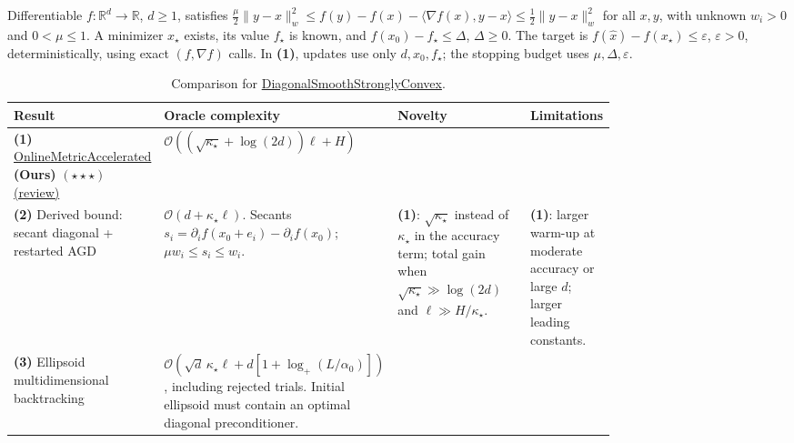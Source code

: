 \begin{table}[tp]
\centering
\caption{Comparison for \href{https://github.com/k3nfalt/longtails/blob/main/LongTails/Setups/DiagonalSmoothStronglyConvex.lean}{DiagonalSmoothStronglyConvex}.}\label{tab:DiagonalSmoothStronglyConvex}
\parbox{\linewidth}{\footnotesize Differentiable $f:\mathbb{R}^d\to\mathbb{R}$, $d\ge1$, satisfies
$\frac{\mu}{2}\|y-x\|_w^2\le f(y)-f(x)-\langle\nabla f(x),y-x\rangle\le\frac12\|y-x\|_w^2$
for all $x,y$, with unknown $w_i>0$ and $0<\mu\le1$. A minimizer $x_\star$ exists, its value $f_\star$ is known, and $f(x_0)-f_\star\le\Delta$, $\Delta\ge0$.
The target is $f(\hat x)-f(x_\star)\le\varepsilon$, $\varepsilon>0$, deterministically, using exact $(f,\nabla f)$ calls. In \textbf{(1)}, updates use only $d,x_0,f_\star$; the stopping budget uses $\mu,\Delta,\varepsilon$.}\par\smallskip
\begin{threeparttable}
\footnotesize
\setlength{\tabcolsep}{4pt}\renewcommand{\arraystretch}{1.25}
\begin{tabularx}{\linewidth}{@{}>{\raggedright\arraybackslash}p{0.20\linewidth}>{\raggedright\arraybackslash}p{0.32\linewidth}>{\raggedright\arraybackslash}p{0.25\linewidth}>{\raggedright\arraybackslash}X@{}}
\toprule
\textbf{Result} & \textbf{Oracle complexity} & \textbf{Novelty} & \textbf{Limitations} \\
\midrule
\textbf{(1)} \href{https://github.com/k3nfalt/longtails/blob/main/LongTails/Theorems/OnlineMetricAccelerated.lean}{Online\allowbreak Metric\allowbreak Accelerated} \textbf{(Ours)} $(\star\star\star)$ \href{https://github.com/k3nfalt/longtails/blob/main/scripts/reviews/OnlineMetricAccelerated.md}{(review)}
& $\mathcal{O}\!\left((\sqrt{\kappa_\star}+\log(2d))\ell+H\right)$ & & \\
\midrule[1.2pt]
\textbf{(2)} Derived bound: secant diagonal + restarted AGD \citep[Prop.~4.1]{diagRoulet2019v2}
& $\mathcal{O}(d+\kappa_\star\ell)$.
Secants $s_i=\partial_i f(x_0+e_i)-\partial_i f(x_0)$; $\mu w_i\le s_i\le w_i$.
& \textbf{(1)}: $\sqrt{\kappa_\star}$ instead of $\kappa_\star$ in the accuracy term; total gain when $\sqrt{\kappa_\star}\gg\log(2d)$ and $\ell\gg H/\kappa_\star$.
& \textbf{(1)}: larger warm-up at moderate accuracy or large $d$; larger leading constants. \\
\midrule
\textbf{(3)} Ellipsoid multidimensional backtracking \citep[Thm.~5.3, Prop.~3.2]{diagKunstner2023v1}
& $\mathcal{O}\!\left(\sqrt d\,\kappa_\star\ell+d[1+\log_+(L/\alpha_0)]\right)$, including rejected trials. Initial ellipsoid must contain an optimal diagonal preconditioner.

\end{tabularx}
\end{threeparttable}
\end{table}
